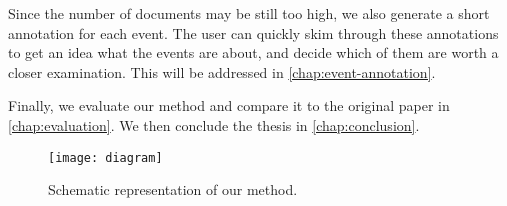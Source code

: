 Since the number of documents may be still too high, we also generate a short annotation for each event. The user can quickly skim through these annotations to get an idea what the events are about, and decide which of them are worth a closer examination. This will be addressed in \autoref{chap:event-annotation}.

Finally, we evaluate our method and compare it to the original paper in \autoref{chap:evaluation}. We then conclude the thesis in \autoref{chap:conclusion}.

\begin{figure}[H]
  \centering
  \texttt{[image: diagram]}
  \caption{Schematic representation of our method.}
  \label{fig:diagram}
\end{figure}